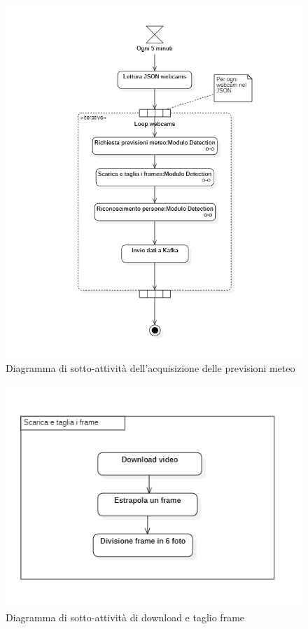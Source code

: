 \begin{figure}[H]
  \begin{center}
    \includegraphics[scale=0.8]{../immagini/diag_PB/detection.png}
    \caption{Diagramma di sotto-attività dell'acquisizione delle previsioni meteo}
  \end{center}
\end{figure}
\begin{figure}[H]
  \begin{center}
    \includegraphics[scale=0.65]{../immagini/diag_PB/download_e_cut_frames.png}
    \caption{Diagramma di sotto-attività di download e taglio frame}
  \end{center}
\end{figure}

